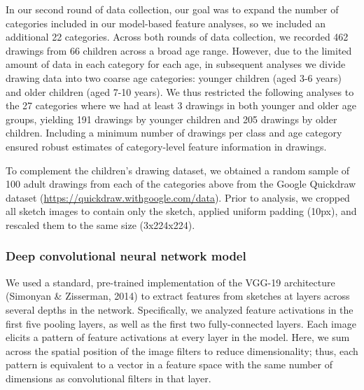 \documentclass[10pt, letterpaper]{article}
\begin{document}
In our second round of data collection, our goal was to expand the
number of categories included in our model-based feature analyses, so we
included an additional 22 categories. Across both rounds of data
collection, we recorded 462 drawings from 66 children across a broad age
range. However, due to the limited amount of data in each category for
each age, in subsequent analyses we divide drawing data into two coarse
age categories: younger children (aged 3-6 years) and older children
(aged 7-10 years). We thus restricted the following analyses to the 27
categories where we had at least 3 drawings in both younger and older
age groups, yielding 191 drawings by younger children and 205 drawings
by older children. Including a minimum number of drawings per class and
age category ensured robust estimates of category-level feature
information in drawings.

To complement the children's drawing dataset, we obtained a random
sample of 100 adult drawings from each of the categories above from the
Google Quickdraw dataset (\url{https://quickdraw.withgoogle.com/data}).
Prior to analysis, we cropped all sketch images to contain only the
sketch, applied uniform padding (10px), and rescaled them to the same
size (3x224x224).

\subsubsection{Deep convolutional neural network
model}\label{deep-convolutional-neural-network-model}

We used a standard, pre-trained implementation of the VGG-19
architecture (Simonyan \& Zisserman, 2014) to extract features from
sketches at layers across several depths in the network. Specifically,
we analyzed feature activations in the first five pooling layers, as
well as the first two fully-connected layers. Each image elicits a
pattern of feature activations at every layer in the model. Here, we sum
across the spatial position of the image filters to reduce
dimensionality; thus, each pattern is equivalent to a vector in a
feature space with the same number of dimensions as convolutional
filters in that layer.
\end{document}
